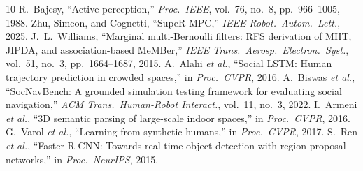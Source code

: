 \documentclass[conference]{IEEEtran}
\begin{document}
\begin{thebibliography}{10}
\footnotesize
{} R.~Bajcsy, ``Active perception,'' \emph{Proc.\ IEEE}, vol.~76, no.~8, pp.~966--1005, 1988.
 Zhu, Simeon, and Cognetti, ``SupeR-MPC,'' \emph{IEEE Robot.\ Autom.\ Lett.}, 2025.
 J.~L.~Williams, ``Marginal multi-Bernoulli filters: RFS derivation of MHT, JIPDA, and association-based MeMBer,'' \emph{IEEE Trans.\ Aerosp.\ Electron.\ Syst.}, vol.~51, no.~3, pp.~1664--1687, 2015.
 A.~Alahi \emph{et al.}, ``Social LSTM: Human trajectory prediction in crowded spaces,'' in \emph{Proc.\ CVPR}, 2016.
 A.~Biswas \emph{et al.}, ``SocNavBench: A grounded simulation testing framework for evaluating social navigation,'' \emph{ACM Trans.\ Human-Robot Interact.}, vol.~11, no.~3, 2022.
 I.~Armeni \emph{et al.}, ``3D semantic parsing of large-scale indoor spaces,'' in \emph{Proc.\ CVPR}, 2016.
 G.~Varol \emph{et al.}, ``Learning from synthetic humans,'' in \emph{Proc.\ CVPR}, 2017.
 S.~Ren \emph{et al.}, ``Faster R-CNN: Towards real-time object detection with region proposal networks,'' in \emph{Proc.\ NeurIPS}, 2015.
\end{thebibliography}
\end{document}
